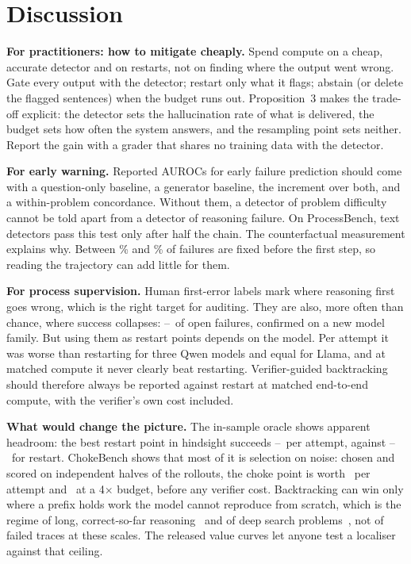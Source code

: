 \documentclass[10pt,twocolumn]{article}
\begin{document}












\section{Discussion}
\textbf{For practitioners: how to mitigate cheaply.} Spend compute on a cheap, accurate detector and
on restarts, not on finding where the output went wrong. Gate every output with the detector;
restart only what it flags; abstain (or delete the flagged sentences) when the budget runs out.
Proposition~3 makes the trade-off explicit: the detector sets the hallucination rate of what is
delivered, the budget sets how often the system answers, and the resampling point sets neither.
Report the gain with a grader that shares no training data with the detector.

\textbf{For early warning.} Reported AUROCs for early failure prediction should come with a
question-only baseline, a generator baseline, the increment over both, and a within-problem
concordance. Without them, a detector of problem difficulty cannot be told apart from a detector of
reasoning failure. On ProcessBench, text detectors pass this test only after half the chain. The
counterfactual measurement explains why. Between \QwenSmallAllCapPct\% and \QwenMathCapPct\% of
failures are fixed before the first step, so reading the trajectory can add little for them.

\textbf{For process supervision.} Human first-error labels mark where reasoning first goes wrong,
which is the right target for auditing. They are also, more often than chance, where success
collapses: \QwenMathDec--\QwenSmallAllDec\ of open failures, confirmed on a new model family. But using them as restart
points depends on the model. Per attempt it was worse than restarting for three Qwen models and
equal for Llama, and at matched compute it never clearly beat restarting. Verifier-guided
backtracking should therefore always be reported against restart at matched end-to-end compute,
with the verifier's own cost included.

\textbf{What would change the picture.} The in-sample oracle shows apparent headroom: the best
restart point in hindsight succeeds \QwenSmallAllBtOracle--\LlamaBtOracle\ per attempt, against
\QwenMathBtRestart--\QwenTwoAllBtRestart\ for restart. ChokeBench shows that most of it is
selection on noise: chosen and scored on independent halves of the rollouts, the choke point is
worth \cbOracleGain\ per attempt and \cbOracleGainB\ at a 4$\times$ budget, before any verifier
cost. Backtracking can win only where a prefix holds work the model cannot reproduce from scratch,
which is the regime of long, correct-so-far reasoning~\cite{bulut2026} and of deep search
problems~\cite{qin2025backtrack}, not of failed traces at these scales. The released value curves
let anyone test a localiser against that ceiling.
\end{document}

